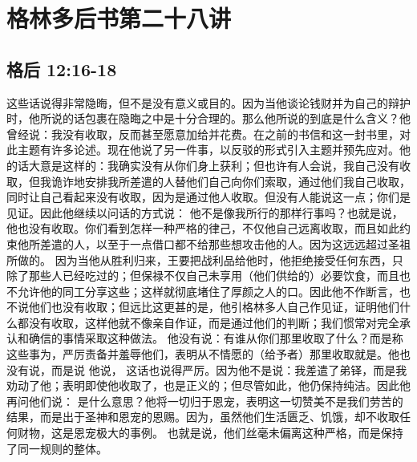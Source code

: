 \section{格林多后书第二十八讲}


\subsection{格后 12:16-18}

\par

\par

这些话说得非常隐晦，但不是没有意义或目的。因为当他谈论钱财并为自己的辩护时，他所说的话包裹在隐晦之中是十分合理的。那么他所说的到底是什么含义？他曾经说：我没有收取，反而甚至愿意加给并花费。在之前的书信和这一封书里，对此主题有许多论述。现在他说了另一件事，以反驳的形式引入主题并预先应对。他的话大意是这样的：我确实没有从你们身上获利；但也许有人会说，我自己没有收取，但我诡诈地安排我所差遣的人替他们自己向你们索取，通过他们我自己收取，同时让自己看起来没有收取，因为是通过他人收取。但没有人能说这一点；你们是见证。因此他继续以问话的方式说： 他不是像我所行的那样行事吗？也就是说，他也没有收取。你们看到怎样一种严格的律己，不仅他自己远离收取，而且如此约束他所差遣的人，以至于一点借口都不给那些想攻击他的人。因为这远远超过圣祖所做的。 因为当他从胜利归来，王要把战利品给他时，他拒绝接受任何东西，只除了那些人已经吃过的；但保禄不仅自己未享用（他们供给的）必要饮食，而且也不允许他的同工分享这些；这样就彻底堵住了厚颜之人的口。因此他不作断言，也不说他们也没有收取；但远比这更甚的是，他引格林多人自己作见证，证明他们什么都没有收取，这样他就不像亲自作证，而是通过他们的判断；我们惯常对完全承认和确信的事情采取这种做法。 他没有说：有谁从你们那里收取了什么？而是称这些事为，严厉责备并羞辱他们，表明从不情愿的（给予者）那里收取就是。他也没有说，而是说 他说， 这话也说得严厉。因为他不是说：我差遣了弟铎，而是我劝动了他；表明即使他收取了，也是正义的；但尽管如此，他仍保持纯洁。因此他再问他们说： 是什么意思？他将一切归于恩宠，表明这一切赞美不是我们劳苦的结果，而是出于圣神和恩宠的恩赐。因为，虽然他们生活匮乏、饥饿，却不收取任何财物，这是恩宠极大的事例。 也就是说，他们丝毫未偏离这种严格，而是保持了同一规则的整体。\par

